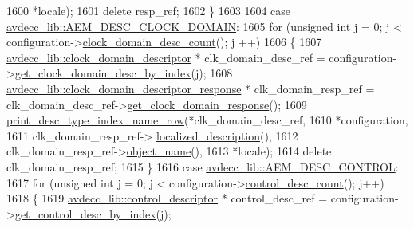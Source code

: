 \begin{DoxyCode}
1600                                                *locale);
1601                 \textcolor{keyword}{delete} resp\_ref;
1602             \}
1603 
1604         \textcolor{keywordflow}{case} \hyperlink{namespaceavdecc__lib_ac7b7d227e46bc72b63ee9e9aae15902fa9a2f5c4896329bb03b27b36e98ed5e93}{avdecc\_lib::AEM\_DESC\_CLOCK\_DOMAIN}:
1605             \textcolor{keywordflow}{for} (\textcolor{keywordtype}{unsigned} \textcolor{keywordtype}{int} j = 0; j < configuration->\hyperlink{classavdecc__lib_1_1configuration__descriptor_aaf707ea8fc30234388930ff17456f610}{clock\_domain\_desc\_count}(); j
      ++)
1606             \{
1607                 \hyperlink{classavdecc__lib_1_1clock__domain__descriptor}{avdecc\_lib::clock\_domain\_descriptor} * 
      clk\_domain\_desc\_ref = configuration->\hyperlink{classavdecc__lib_1_1configuration__descriptor_ab5603e0fa2cc0695b240fe856b62776d}{get\_clock\_domain\_desc\_by\_index}(j);
1608                 \hyperlink{classavdecc__lib_1_1clock__domain__descriptor__response}{avdecc\_lib::clock\_domain\_descriptor\_response} * 
      clk\_domain\_resp\_ref = clk\_domain\_desc\_ref->\hyperlink{classavdecc__lib_1_1clock__domain__descriptor_a2c3eca99d20f1396befa4e71e438593c}{get\_clock\_domain\_response}();
1609                 \hyperlink{classcmd__line_ac47c21c03b69593b74e7c43201d0ba41}{print\_desc\_type\_index\_name\_row}(*clk\_domain\_desc\_ref,
1610                                                *configuration,
1611                                                clk\_domain\_resp\_ref->
      \hyperlink{classavdecc__lib_1_1clock__domain__descriptor__response_a1fb9de45567df344090a1407aa6b775f}{localized\_description}(),
1612                                                clk\_domain\_resp\_ref->\hyperlink{classavdecc__lib_1_1descriptor__response__base_a133f7774946d80f82b8aaaa4cfbb7361}{object\_name}(),
1613                                                *locale);
1614                 \textcolor{keyword}{delete} clk\_domain\_resp\_ref;
1615             \}
1616         \textcolor{keywordflow}{case} \hyperlink{namespaceavdecc__lib_ac7b7d227e46bc72b63ee9e9aae15902fa200b40ee880b3e8c19f1a3f300ecb038}{avdecc\_lib::AEM\_DESC\_CONTROL}:
1617             \textcolor{keywordflow}{for} (\textcolor{keywordtype}{unsigned} \textcolor{keywordtype}{int} j = 0; j < configuration->\hyperlink{classavdecc__lib_1_1configuration__descriptor_adb8ec7a53baa84c4bcdca47cab26f177}{control\_desc\_count}(); j++)
1618             \{
1619                 \hyperlink{classavdecc__lib_1_1control__descriptor}{avdecc\_lib::control\_descriptor} * control\_desc\_ref = 
      configuration->\hyperlink{classavdecc__lib_1_1configuration__descriptor_a970929f76405008ad7c5116ba3b71ca7}{get\_control\_desc\_by\_index}(j);

\end{DoxyCode}

